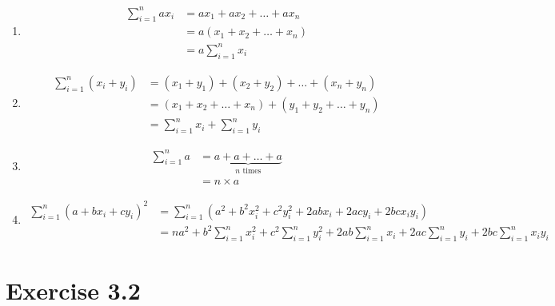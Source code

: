\documentclass[
]{book}
\begin{document}
\begin{enumerate}
\def\labelenumi{\alph{enumi}.}
\item
  \begin{align}
        \sum_{i=1}^{n}ax_i 
        & = ax_1 + ax_2 + \ldots + ax_n \\
        & = a(x_1 + x_2 + \ldots + x_n) \\
        & = a\sum_{i=1}^{n}x_i
    \end{align}
\item
  \begin{align}
        \sum_{i=1}^{n}(x_i + y_i) 
        & = (x_1 + y_1) + (x_2 + y_2) + \ldots + (x_n + y_n) \\
        & = (x_1 + x_2 + \ldots + x_n) + (y_1 + y_2 + \ldots + y_n) \\
        & = \sum_{i=1}^{n} x_i + \sum_{i=1}^{n} y_i
    \end{align}
\item
  \begin{align}
        \sum_{i=1}^{n} a
        & = \underbrace{a + a + \ldots + a}_{n\mbox{ times}} \\
        & = n\times a
    \end{align}
\item
  \begin{align}
        \sum_{i=1}^{n} (a + bx_i + cy_i)^2 
        & = \sum_{i=1}^{n} \left( a^2 + b^2x_i^2 + c^2y_i^2 + 2abx_i + 2acy_i + 2bcx_iy_i \right) \\
        & = na^2 + b^2\sum_{i=1}^{n}x_i^2 + c^2\sum_{i=1}^{n}y_i^2 + 2ab\sum_{i=1}^{n}x_i + 2ac\sum_{i=1}^{n}y_i + 2bc\sum_{i=1}^{n}x_iy_i
    \end{align}
\end{enumerate}

\hypertarget{exercise-3.2}{%
\section{Exercise 3.2}\label{exercise-3.2}}
\end{document}
